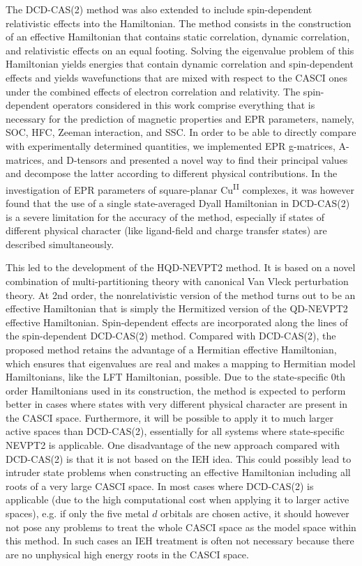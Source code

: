The DCD-CAS(2) method was also extended to include spin-dependent relativistic effects into the Hamiltonian. The method consists in the construction of an effective Hamiltonian that contains
static correlation, dynamic correlation, and relativistic effects on an
equal footing. Solving the eigenvalue problem of this Hamiltonian
yields energies that contain dynamic correlation and spin-dependent
effects and yields wavefunctions that are mixed with respect to the
CASCI ones under the combined effects of electron correlation and
relativity.
The spin-dependent operators considered in this work comprise everything that is necessary for the prediction of magnetic
properties and EPR parameters, namely, SOC, HFC, Zeeman interaction, and SSC. In order to be able to directly compare with experimentally determined quantities, we implemented EPR g-matrices,
A-matrices, and D-tensors and presented a novel way to find their principal values and decompose the
latter according to different physical contributions.
In the investigation of EPR parameters of square-planar Cu\textsuperscript{II} complexes, it was however found that the use of a single state-averaged Dyall Hamiltonian in DCD-CAS(2) is a severe limitation for the accuracy of the method, especially if states of different physical character (like ligand-field and charge transfer states) are described simultaneously.

This led to the development of the HQD-NEVPT2 method. It is based on a novel combination of multi-partitioning theory with canonical Van Vleck perturbation theory. At 2nd order, the nonrelativistic version of the method turns out to be an effective Hamiltonian that is simply the Hermitized version of the QD-NEVPT2 effective Hamiltonian. Spin-dependent effects are incorporated along the lines of the spin-dependent DCD-CAS(2) method.
Compared with DCD-CAS(2), the proposed method retains the advantage of a Hermitian effective Hamiltonian, which ensures that eigenvalues are real and makes a mapping to Hermitian model Hamiltonians, like the LFT Hamiltonian, possible. Due to the state-specific 0th order Hamiltonians used in its construction, the method is expected to perform better in cases where states with very different physical character are present in the CASCI space. Furthermore, it will be possible to apply it to much larger active spaces than DCD-CAS(2), essentially for all systems where state-specific NEVPT2 is applicable. One disadvantage of the new approach compared with DCD-CAS(2) is that it is not based on the IEH idea. This could possibly lead to intruder state problems when constructing an effective Hamiltonian including all roots of a very large CASCI space. In most cases where DCD-CAS(2) is applicable (due to the high computational cost when applying it to larger active spaces), e.g. if only the five metal $d$ orbitals are chosen active, it should however not pose any problems to treat the whole CASCI space as the model space within this method. In such cases an IEH treatment is often not necessary because there are no unphysical high energy roots in the CASCI space.

